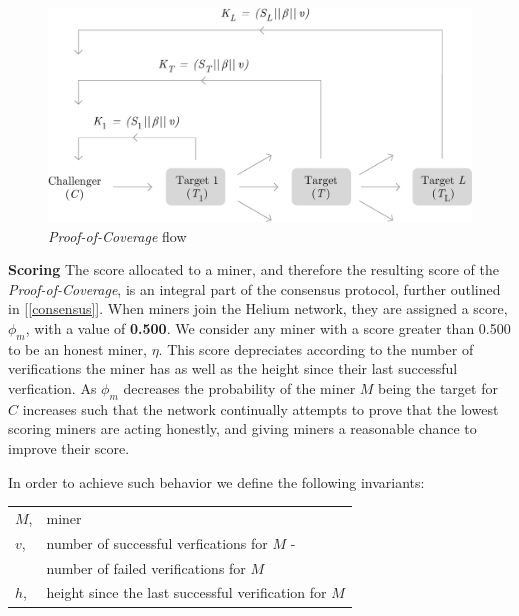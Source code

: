 \documentclass[UTF8, 10pt, nonatbib, nocopyrightspace, reprint]{sigplanconf}
\newcommand{\secref}[1]{[\autoref{#1}]}
\begin{document}
\begin{figure}[ht]
    \begin{center}
          \includegraphics[width=\columnwidth]{o_propagation.eps}
          \caption{\emph{Proof-of-Coverage} flow}
          \label{fig:poc-propogation}
     \end{center}
\end{figure}

\textbf{Scoring} \label{scores} The score allocated to a miner, and therefore the resulting score of the \emph{Proof-of-Coverage}, is an integral part of the consensus protocol, further outlined in \secref{consensus}. When miners join the Helium network, they are assigned a score, $\phi_m$, with a value of \textbf{0.500}. We consider any miner with a score greater than 0.500 to be an honest miner, $\eta$. This score depreciates according to the number of verifications the miner has as well as the height since their last successful verfication. As $\phi_m$ decreases the probability of the miner $M$ being the target for $C$ increases such that the network continually attempts to prove that the lowest scoring miners are acting honestly, and giving miners a reasonable chance to improve their score.

In order to achieve such behavior we define the following invariants:

\begin{tabular}{l l}
        $M$, & miner                                         \\
        $v$, &number of successful verfications for $M$ -\\
        & number of failed verifications for $M$ \\
        $h$,          & height since the last successful verification for $M$\\
\end{tabular}
\end{document}
